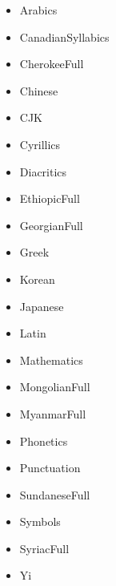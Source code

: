 \documentclass{article}
\newenvironment{itemlist}{%
  \begin{itemize}
	\setlength{\itemsep}{0pt}
	\setlength{\parsep}{0pt}
	\setlength{\topsep}{0pt}
	\setlength{\partopsep}{0pt}
	\setlength{\parskip}{0pt}
	\setlength{\labelsep}{5pt}}%
{
  \end{itemize}}
\begin{document}
		\begin{multicols*}{2}
			\begin{itemlist}
				\item Arabics
				\item CanadianSyllabics
				\item CherokeeFull
				\item Chinese
				\item CJK
				\item Cyrillics
				\item Diacritics
				\item EthiopicFull
				\item GeorgianFull
				\item Greek
				\item Korean
				\item Japanese
				\item Latin
				\item Mathematics
				\item MongolianFull
				\item MyanmarFull
				\item Phonetics
				\item Punctuation
				\item SundaneseFull
				\item Symbols
				\item SyriacFull
				\item Yi
			\end{itemlist}
		\end{multicols*}
\end{document}
